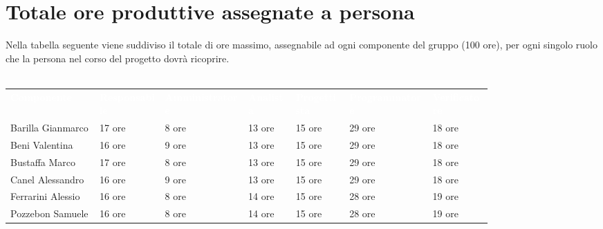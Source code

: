 \section{Totale ore produttive assegnate a persona}
Nella tabella seguente viene suddiviso il totale di ore massimo, assegnabile ad ogni componente del gruppo
(100 ore), per ogni singolo ruolo che la persona nel corso del progetto dovrà ricoprire.\\\\
{\renewcommand{\arraystretch}{1.5}
\scriptsize
\begin{tabular}{p{0.15\linewidth}p{0.11\linewidth}p{0.14\linewidth}p{0.08\linewidth}p{0.09\linewidth}p{0.14\linewidth}p{0.10\linewidth}}
	\rowcolor[RGB]{33, 73, 50}
	\textcolor{white}{\textbf{Componente}} & \textcolor{white}{\textbf{Responsabile}} & \textcolor{white}
	{\textbf{Amministratore}} & \textcolor{white}{\textbf{Analista}} & \textcolor{white}
	{\textbf{Progettista}} & \textcolor{white}{\textbf{Programmatore}} & \textcolor{white}{\textbf{Verificatore}}\\
	\rowcolor[RGB]{216, 235, 171}
	Barilla Gianmarco & 17 ore & 8 ore & 13 ore & 15 ore & 29 ore & 18 ore		\\
	\rowcolor[RGB]{233, 245, 206}
	Beni Valentina & 16 ore & 9 ore & 13 ore & 15 ore & 29 ore & 18 ore        	\\
	\rowcolor[RGB]{216, 235, 171}
	Bustaffa Marco & 17 ore & 8 ore & 13 ore & 15 ore & 29 ore & 18 ore      	\\
    \rowcolor[RGB]{233, 245, 206}
	Canel Alessandro & 16 ore & 9 ore & 13 ore & 15 ore & 29 ore & 18 ore     	\\
    \rowcolor[RGB]{216, 235, 171}
	Ferrarini Alessio & 16 ore & 8 ore & 14 ore & 15 ore & 28 ore & 19 ore     	\\
    \rowcolor[RGB]{233, 245, 206}
	Pozzebon Samuele & 16 ore & 8 ore & 14 ore & 15 ore & 28 ore & 19 ore    	\\
\end{tabular}	
}
